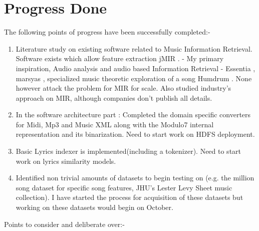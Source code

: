\chapter{Progress Done}
The following points of progress have been successfully completed:-
\begin{enumerate}
\item Literature study on existing software related to Music Information Retrieval. Software exists which allow feature extraction {jMIR \cite{jMIR}.  - My primary inspiration}, Audio analysis and audio based Information Retrieval - {Essentia \cite{essentia}, marsyas \cite{marsyas}}, specialized music theoretic exploration of a song {Humdrum \cite{humdrum}}. None however attack the problem for MIR for scale. Also studied industry's approach on MIR, although companies don't publish all details. 
\item In the software architecture part : Completed the domain specific converters for Midi, Mp3 and Music XML along with the Modulo7 internal representation and its binarization. Need to start work on HDFS deployment.
\item Basic Lyrics indexer is implemented(including a tokenizer). Need to start work on lyrics similarity models. 
\item Identified non trivial amounts of datasets to begin testing on (e.g. the million song dataset for specific song features, JHU's Lester Levy Sheet music collection). I have started the process for acquisition of these datasets but working on these datasets would begin on October. 
\end{enumerate}
Points to consider and deliberate over:-
